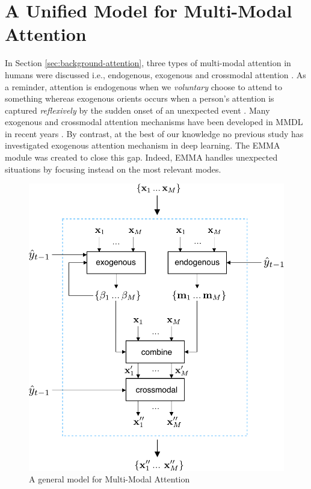 \chapter{A Unified Model for Multi-Modal Attention} 
\label{chapter-unified} 

In Section \ref{sec:background-attention}, three types of multi-modal attention in humans were discussed i.e., endogenous, exogenous and crossmodal attention \citep{crossmodal}. As a reminder, attention is endogenous when we \textit{voluntary} choose to attend to something whereas exogenous orients occurs when a person's attention is captured \textit{reflexively} by the sudden onset of an unexpected event \citep{crossmodal}. Many exogenous and crossmodal attention mechanisms have been developed in MMDL in recent years \citep{attention-need, cross-transformer}. By contrast, at the best of our knowledge no previous study has investigated exogenous attention mechanism in deep learning. The EMMA module was created to close this gap. Indeed, EMMA handles unexpected situations by focusing instead on the most relevant modes.

\begin{figure}[hbt!]
\centering
\includegraphics[scale=0.6]{figures/unified}
\vspace*{1cm}
\caption{A general model for Multi-Modal Attention}
\label{fig:complete-model}
\end{figure}

